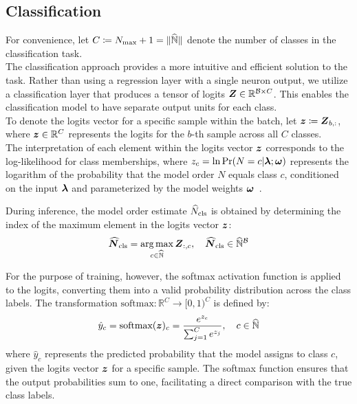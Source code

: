 \subsection{Classification}
For convenience, let \( C \coloneq N_{\max} + 1 = \| \widehat{\mathbb{N}} \| \) denote the number of classes in the classification task.\\
The classification approach provides a more intuitive and efficient solution to the task. Rather than using a regression
layer with a single neuron output, we utilize a classification layer that produces a tensor of logits \( \boldsymbol{Z} \in \mathbb{R}^{\mathcal{B} \times C}\).
This enables the classification model to have separate output units for each class.\\
To denote the logits vector for a specific sample within the batch, let \( \boldsymbol{z} \coloneq \boldsymbol{Z}_{b,:} \),
where \( \boldsymbol{z} \in \mathbb{R}^{C} \) represents the logits for the \( b \)-th sample across all \( C \) classes.\\
The interpretation of each element within the logits vector \( \boldsymbol{z} \) corresponds to the log-likelihood for class
memberships, where \( z_c = \ln \Pr(N=c|\boldsymbol{\lambda}; \boldsymbol{\omega}) \) represents the logarithm of the probability that
the model order \( N \) equals class \( c \), conditioned on the input \( \boldsymbol{\lambda} \) and parameterized by the model weights
\( \boldsymbol{\omega} \)~\cite[Chapter 6]{dlbook}.

During inference, the model order estimate \( \widehat{N}_{\text{cls}} \) is obtained by determining the index of the maximum element in
the logits vector \( \boldsymbol{z} \):
\begin{equation}
    \boldsymbol{\widehat{N}}_{\text{cls}} = \operatorname*{arg\,max}_{c \in \widehat{\mathbb{N}}} \boldsymbol{Z}_{:,c}, \quad \boldsymbol{\widehat{N}}_{\text{cls}} \in \widehat{\mathbb{N}}^{\mathcal{B}}
    \label{eq:classification_argmax}
\end{equation}

For the purpose of training, however, the softmax activation function is applied to the logits, converting them into a valid probability
distribution across the class labels. The transformation \( \mathrm{softmax} : \mathbb{R}^C \rightarrow [0, 1)^C \) is defined by:
\begin{equation}
    \hat{y}_c = \text{softmax}(\boldsymbol{z})_c = \frac{e^{z_c}}{\sum_{j=1}^{C} e^{z_j}}, \quad c \in \widehat{\mathbb{N}}
    \label{eq:softmax}
\end{equation}
where \(\hat{y}_c\) represents the predicted probability that the model assigns to class \(c\), given the logits
vector \(\boldsymbol{z}\) for a specific sample. The softmax function ensures that the output probabilities sum to one,
facilitating a direct comparison with the true class labels.

